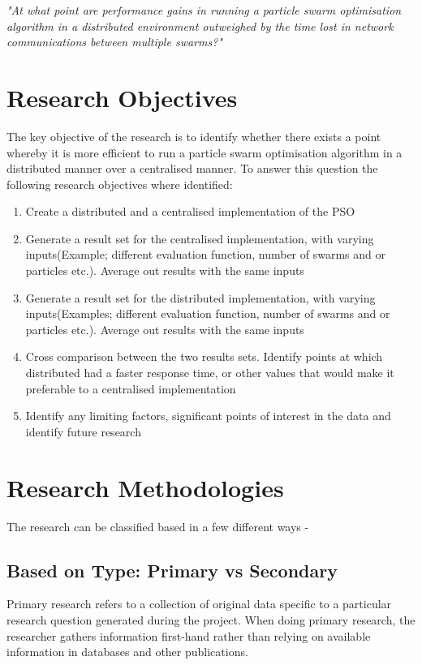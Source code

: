 \documentclass[oneside,12pt]{book}
\begin{document}
\textit{"At what point are performance gains in running a particle swarm optimisation algorithm in a distributed environment outweighed by the time lost in network communications between multiple swarms?"}

\section{Research Objectives}
The key objective of the research is to identify whether there exists a point whereby it is more efficient to run a particle swarm optimisation algorithm in a distributed manner over a centralised manner. To answer this question the following research objectives where identified:
\begin{enumerate}
\item Create a distributed and a centralised implementation of the PSO
\item Generate a result set for the centralised implementation, with varying inputs(Example; different evaluation function, number of swarms and or particles etc.). Average out results with the same inputs
\item Generate a result set for the distributed implementation, with varying inputs(Examples; different evaluation function, number of swarms and or particles etc.). Average out results with the same inputs
\item Cross comparison between the two results sets. Identify points at which distributed had a faster response time, or other values that would make it preferable to a centralised implementation
\item Identify any limiting factors, significant points of interest in the data and identify future research
\end{enumerate}


\section{Research Methodologies}
The research can be classified based in a few different ways -

\subsection{Based on Type: Primary vs Secondary}
Primary research refers to a collection of original data specific to a particular research question generated during the project. When doing primary research, the researcher gathers information first-hand rather than relying on available information in databases and other publications.\cite{bouchrika_2020}
\end{document}
